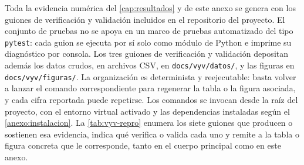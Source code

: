 Toda la evidencia numérica del \autoref{cap:resultados} y de este anexo se genera con los guiones de verificación y validación incluidos en el repositorio del proyecto. El conjunto de pruebas no se apoya en un marco de pruebas automatizado del tipo \texttt{pytest}: cada guion se ejecuta por sí solo como módulo de Python e imprime su diagnóstico por consola. Los tres guiones de verificación y validación depositan además los datos crudos, en archivos CSV, en \texttt{docs/vyv/datos/}, y las figuras en \texttt{docs/vyv/figuras/}. La organización es determinista y reejecutable: basta volver a lanzar el comando correspondiente para regenerar la tabla o la figura asociada, y cada cifra reportada puede repetirse. Los comandos se invocan desde la raíz del proyecto, con el entorno virtual activado y las dependencias instaladas según el \autoref{anexo:instalacion}. La \autoref{tab:vyv-repro} enumera los siete guiones que producen o sostienen esa evidencia, indica qué verifica o valida cada uno y remite a la tabla o figura concreta que le corresponde, tanto en el cuerpo principal como en este anexo.

